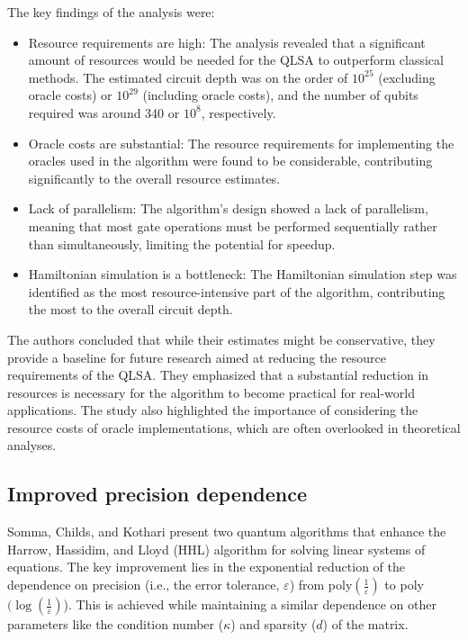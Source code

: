 \documentclass[12pt]{extarticle}
\begin{document}
The key findings of the analysis were:
\begin{itemize}
\item Resource requirements are high: The analysis revealed that a significant amount of resources would be needed for the QLSA to outperform classical methods.
The estimated circuit depth was on the order of $10^{25}$ (excluding oracle costs) or $10^{29}$ (including oracle costs), and the number of qubits required was around 340 or $10^8$, respectively.
\item Oracle costs are substantial: The resource requirements for implementing the oracles used in the algorithm were found to be considerable, contributing significantly to the overall resource estimates.
\item Lack of parallelism: The algorithm's design showed a lack of parallelism, meaning that most gate operations must be performed sequentially rather than simultaneously, limiting the potential for speedup.
\item Hamiltonian simulation is a bottleneck: The Hamiltonian simulation step was identified as the most resource-intensive part of the algorithm, contributing the most to the overall circuit depth.
\end{itemize}
The authors concluded that while their estimates might be conservative, they provide a baseline for future research aimed at reducing the resource requirements of the QLSA.
They emphasized that a substantial reduction in resources is necessary for the algorithm to become practical for real-world applications.
The study also highlighted the importance of considering the resource costs of oracle implementations, which are often overlooked in theoretical analyses.

\subsection{Improved precision dependence}


Somma, Childs, and Kothari\cite{somma2016quantum} present two quantum algorithms that enhance the Harrow, Hassidim, and Lloyd (HHL) algorithm for solving linear systems of equations.
The key improvement lies in the exponential reduction of the dependence on precision (i.e., the error tolerance, $\varepsilon$) from poly$(\frac{1}{\varepsilon})$ to poly$(\log(\frac{1}{\varepsilon})$).
This is achieved while maintaining a similar dependence on other parameters like the condition number ($\kappa$) and sparsity ($d$) of the matrix.
\end{document}
